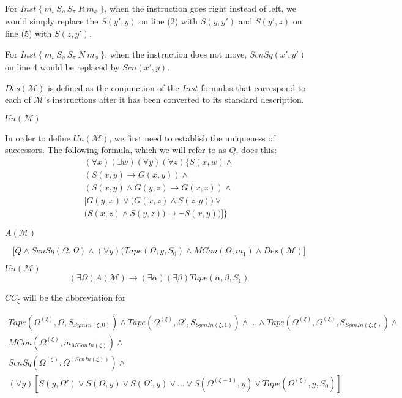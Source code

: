 \documentclass[11pt]{article}
\newcommand{\?}{\stackrel{?}{=}}
\begin{document}
For $Inst \ \{ \ m_\iota \ S_\rho \ S_\pi \ R \ m_\phi \ \}$, when the instruction goes right instead of left, we would simply replace the  $S(y', y)$ on line (2) with $S(y, y')$ and $S(y',z)$ on line (5) with $S(z, y')$. 

For $Inst \ \{ \ m_\iota \ S_\rho \ S_\pi \ N \ m_\phi \ \}$, when the instruction does not move, $ScnSq(x',y')$ on line 4 would be replaced by $Scn(x',y)$.

$Des(\mathscr{M})$ is defined as the conjunction of the $Inst$ formulas that correspond to each of $\mathscr{M}$'s instructions after it has been converted to its standard description. 

$Un(\mathscr{M})$

In order to define $Un(\mathscr{M})$, we first need to establish the uniqueness of successors. The following formula, which we will refer to as $Q$, does this:
\begin{align}
(\forall x)(\exists w)(\forall y)(\forall z)\bigg\{S(x, w) \land \\
(S(x, y) \to G(x, y)) \land \\
(S(x, y) \land G(y, z) \to G(x, z)) \land \\
\Big[ G(y, x) \lor \big(G(x, z) \land S(z, y)\big) \lor\\
\big(S(x,z) \land S(y,z)\big) \to \neg S(x, y)) \Big] \bigg\}
\end{align}

$A(\mathscr{M})$

$$\Big[ Q \land ScnSq(\Omega, \Omega) \land (\forall y)(Tape(\Omega, y, S_0) \land MCon(\Omega, m_1) \land Des(\mathscr{M}) \Big ]$$

$Un(\mathscr{M})$
$$(\exists \Omega)A(\mathscr{M}) \to (\exists \alpha)(\exists \beta)Tape(\alpha, \beta, S_1)$$

$CC_\xi$ will be the abbreviation for

\begin{align}
Tape(\Omega^{(\xi)},\Omega,S_{SymIn(\xi,0)}) \land Tape(\Omega^{(\xi)},\Omega',S_{SymIn(\xi,1)}) \land \dots \land Tape(\Omega^{(\xi)},\Omega^{(\xi)},S_{SymIn(\xi,\xi)}) \land \\
MCon(\Omega^{(\xi)},m_{MConIn(\xi)}) \land \\
ScnSq(\Omega^{(\xi)},\Omega^{(ScnIn(\xi))}) \land \\
(\forall y)[S(y,\Omega') \lor S(\Omega,y) \lor S(\Omega',y) \lor \dots \lor S(\Omega^{(\xi-1)},y) \lor Tape(\Omega^{(\xi)},y,S_0)]
\end{align}
\end{document}
